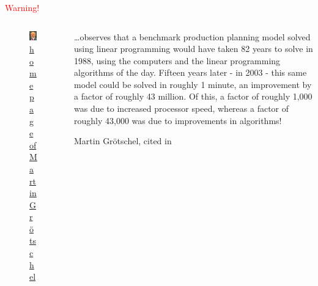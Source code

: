 \documentclass[9pt,xcolor=table]{beamer}
\begin{document}
\begin{frame}
\frametitle{\insertsection{}}
\begin{center}
  \huge\textcolor{red}{Warning!}
\end{center}
\begin{columns}[c]
  \begin{column}{.35\textwidth}
    \begin{figure}[htb]
      \includegraphics[width=\textwidth]{img/MartinGroetschel}\\[6pt]
      \small\href{http://www.zib.de/groetschel/Meine-Galerie/MartinGroetschel.JPG.html}{homepage of Martin Gr\"otschel}
    \end{figure}
  \end{column}
  \begin{column}{.6\textwidth}
\large
  \dots observes that a benchmark production planning model solved using linear programming would have taken 82 years to solve in 1988, using the computers and the linear programming algorithms of the day. Fifteen years later - in 2003 - this same model could be solved in roughly 1 minute, an improvement by a factor of roughly 43 million. Of this, a factor of roughly 1,000 was due to increased processor speed, \alert<2->{whereas a factor of roughly 43,000 was due to improvements in algorithms}!\\[12pt]
  \begin{raggedright}
    \small{Martin Gr\"otschel, cited in \cite{DesigningDigitalFuture}}
  \end{raggedright}
  \end{column}
\end{columns}
\end{frame}
\end{document}

